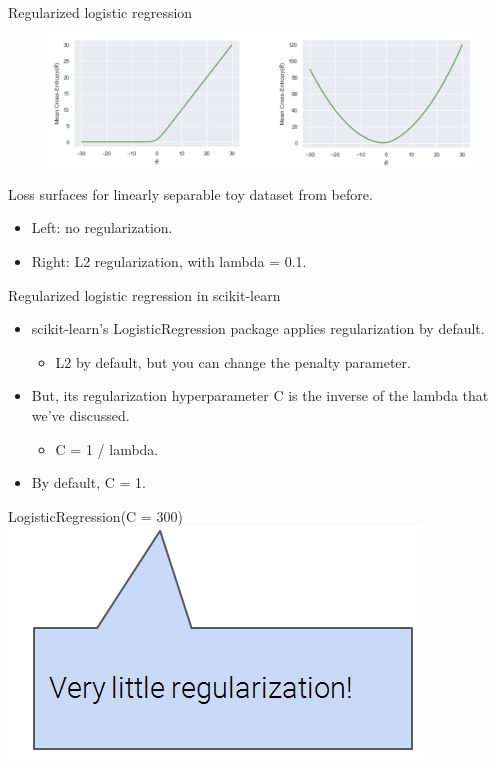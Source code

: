 \documentclass[aspectratio=169]{../latex_main/tntbeamer}  %
\begin{document}
	 
	 \begin{frame}{Regularized logistic regression}
	    \begin{figure}
	        \centering
	        \includegraphics[scale=.4]{Bild47}
	    \end{figure}
	     Loss surfaces for linearly separable toy dataset from before.
	     \begin{itemize}
	         \item Left: no regularization.
	         \item Right: L2 regularization, with lambda = 0.1.
	     \end{itemize}
	 \end{frame}
	 
	 
	 \begin{frame}{Regularized logistic regression in scikit-learn}
	    \begin{itemize}
	        \item scikit-learn’s LogisticRegression package applies regularization by default.
	        \begin{itemize}
	            \item L2 by default, but you can change the penalty parameter.
	        \end{itemize}
	        \item But, its regularization hyperparameter C is the inverse of the lambda that we’ve discussed.
	        \begin{itemize}
	            \item C = 1 / lambda.
	        \end{itemize}
	        \item By default, C = 1.
	    \end{itemize}
	    

	   \bigskip
	   LogisticRegression(C = 300)\\
	   \includegraphics[scale=.5]{Bild48}

	 \end{frame}
\end{document}
